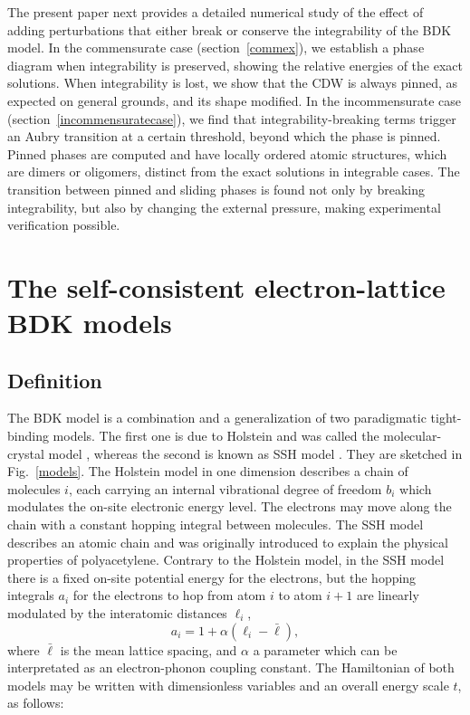 \documentclass[]{revtex4-1}
\begin{document}
The present paper next provides a detailed numerical study of the effect of adding perturbations that either break or conserve the integrability of the BDK model. In the commensurate case (section~\ref{commex}), we establish a phase diagram when integrability is preserved, showing the relative energies of the exact solutions. When integrability is lost, we show that the CDW is always pinned, as expected on general grounds, and its shape modified. In the incommensurate case (section~\ref{incommensuratecase}), we find that integrability-breaking terms trigger an Aubry transition at a certain threshold, beyond which the phase is pinned. Pinned phases 
are computed and have locally ordered atomic structures, which are dimers or oligomers, distinct from the exact solutions in integrable cases. The transition between pinned and sliding phases is found not only by breaking integrability, but also by changing the external pressure, making experimental verification possible.%

\section{The self-consistent electron-lattice BDK models}
\label{definitions}

\subsection{Definition}

The BDK model is a combination and a generalization of two paradigmatic tight-binding models. The first one is due to Holstein and was called the molecular-crystal model \cite{holstein}, whereas the second  is known as SSH model \cite{ssh}. They are sketched in Fig.~\ref{models}.
The Holstein model in one dimension describes a chain of molecules $i$, each carrying an internal vibrational degree of freedom $b_i$ which modulates the on-site electronic energy level. The electrons may move along  the chain with a constant hopping integral between molecules. The SSH model describes an atomic chain  and was originally introduced to explain the physical properties of polyacetylene. Contrary to the Holstein model, in the SSH model there is a fixed on-site potential energy for the electrons, but the hopping integrals $a_i$ for the electrons to hop from atom $i$ to atom $i+1$ are linearly modulated by the interatomic distances $\ell_i$, \begin{equation} a_i=1+\alpha (\ell_i-\bar{\ell}), \label{sshai} \end{equation} where $\bar{\ell}$ is the mean lattice spacing, and $\alpha$ a parameter which can be interpretated as an electron-phonon coupling constant. 
 The Hamiltonian of both models may be written with dimensionless variables and an overall energy scale $t$, as follows:
\end{document}
